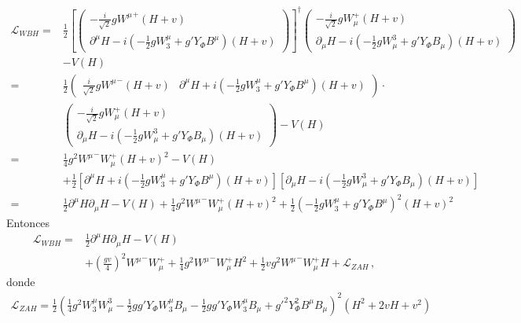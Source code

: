 \begin{frame}
\begin{align}
  \mathcal{L}_{WBH}=&\frac{1}{2}\left[\begin{pmatrix}
    -\frac{i}{\sqrt{2}}g{W^\mu}^+(H+v)\\
    \partial^\mu H-i\left(-\frac{1}{2}gW_3^\mu+g'Y_\Phi B^\mu\right)(H+v)
  \end{pmatrix}\right]^\dagger\begin{pmatrix}
    -\frac{i}{\sqrt{2}}gW_\mu^+(H+v)\\
    \partial_\mu H-i\left(-\frac{1}{2}gW^3_\mu+g'Y_\Phi B_\mu\right)(H+v)
  \end{pmatrix}\nonumber\\
  &-V(H)\nonumber\\
=&\frac{1}{2}\begin{pmatrix}
    \frac{i}{\sqrt{2}}g{W^\mu}^-(H+v)&
    \partial^\mu H+i\left(-\frac{1}{2}gW_3^\mu+g'Y_\Phi B^\mu\right)(H+v)
  \end{pmatrix}\cdot\nonumber\\
  &\begin{pmatrix}
    -\frac{i}{\sqrt{2}}gW_\mu^+(H+v)\\
    \partial_\mu H-i\left(-\frac{1}{2}gW^3_\mu+g'Y_\Phi B_\mu\right)(H+v)
  \end{pmatrix}-V(H)\nonumber\\
  =&\frac{1}{4}g^2{W^\mu}^-W_\mu^+(H+v)^2-V(H)\nonumber\\
  &+\frac{1}{2}\left[\partial^\mu H+i\left(-\tfrac{1}{2}gW_3^\mu+g'Y_\Phi B^\mu\right)(H+v)\right]\left[\partial_\mu H-i\left(-\tfrac{1}{2}gW^3_\mu+g'Y_\Phi B_\mu\right)(H+v)\right]\nonumber\\
 =&\frac{1}{2}\partial^\mu H\partial_\mu H-V(H)
  +\frac{1}{4}g^2{W^\mu}^-W_\mu^+(H+v)^2+\frac{1}{2}\left(-\tfrac{1}{2}gW_3^\mu+g'Y_\Phi B^\mu\right)^2(H+v)^2
\end{align}
Entonces
\begin{align}
  \label{eq:96qft}
  \mathcal{L}_{WBH}=&\frac{1}{2}\partial^\mu H\partial_\mu H-V(H)\nonumber\\
  &+\left(\frac{gv}{4}\right)^2{W^\mu}^-W_\mu^++\frac{1}{4}g^2{W^\mu}^-W_\mu^+H^2+\frac{1}{2}vg^2{W^\mu}^-W_\mu^+H+\mathcal{L}_{Z A H}\,,
\end{align}
donde
\begin{align}
  \mathcal{L}_{ZAH}=\frac{1}{2}\left(\tfrac{1}{4}g^2W_3^\mu W^3_\mu-\tfrac{1}{2}gg'Y_\Phi W_3^\mu B_\mu-\tfrac{1}{2}gg'Y_\Phi W_3^\mu B_\mu+{g'}^2Y_\Phi ^2B^\mu B_\mu\right)^2\left(H^2+2vH+v^2\right)
\end{align}

\end{frame}
